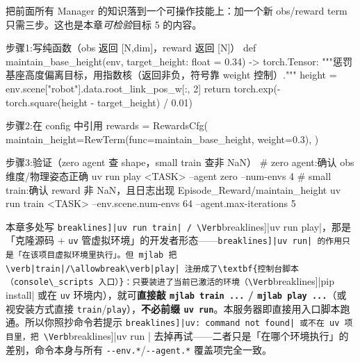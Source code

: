 把前面所有 Manager 的知识落到一个可操作技能上：加一个新 obs/reward term 只需三步。这也是本章\emph{可检验}目标 5 的内容。

\begin{codebox}[Python]{步骤1:写纯函数（obs 返回 [N,dim]，reward 返回 [N]）}
def maintain_base_height(env, target_height: float = 0.34) -> torch.Tensor:
    """惩罚基座高度偏离目标，用指数核（返回非负，符号靠 weight 控制）."""
    height = env.scene["robot"].data.root_link_pos_w[:, 2]
    return torch.exp(-torch.square(height - target_height) / 0.01)
\end{codebox}

\begin{codebox}[Python]{步骤2:在 config 中引用}
rewards = RewardsCfg(
    maintain_height=RewTerm(func=maintain_base_height, weight=0.3),
)
\end{codebox}

\begin{codebox}[bash]{步骤3:验证（zero agent 查 shape，small train 查非 NaN）}
# zero agent:确认 obs 维度/物理姿态正确
uv run play <TASK> --agent zero --num-envs 4
# small train:确认 reward 非 NaN，且日志出现 Episode_Reward/maintain_height
uv run train <TASK> --env.scene.num-envs 64 --agent.max-iterations 5
\end{codebox}


\begin{note}
本章多处写 \Verb[breaklines]|uv run train| / \Verb[breaklines]|uv run play|，那是「克隆源码 + \texttt{uv} 管虚拟环境」的开发者形态——\Verb[breaklines]|uv run| 的作用只是「在该项目虚拟环境里执行」。但 mjlab 把 \verb|train|/\allowbreak\verb|play| 注册成了\textbf{控制台脚本（console\_scripts 入口）}：只要装进了当前已激活的环境（\Verb[breaklines]|pip install| 或在 \verb|uv| 环境内），就可\textbf{直接敲 \texttt{mjlab train ...} / \texttt{mjlab play ...}}（或视安装方式直接 \verb|train|/\allowbreak\verb|play|），\textbf{不必前缀 \texttt{uv run}}。本服务器即直接用入口脚本跑通。所以你照抄命令若提示 \Verb[breaklines]|uv: command not found| 或不在 uv 项目里，把 \Verb[breaklines]|uv run | 去掉再试——二者只是「在哪个环境执行」的差别，命令本身与所有 \verb|--env.*|/\allowbreak\verb|--agent.*| 覆盖项完全一致。
\end{note}


